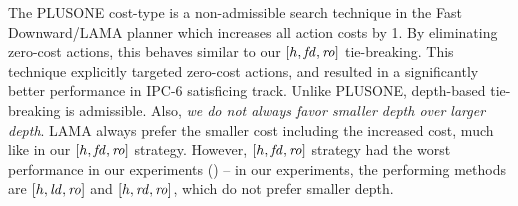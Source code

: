 The PLUSONE %
cost-type is a non-admissible search technique in the Fast Downward/LAMA planner
\cite{richter2010lama} which increases all action costs by 1.
By eliminating zero-cost actions, this behaves similar to our
$[h,\mbox{\textit{fd}},\mbox{\textit{ro}}]$ tie-breaking.
This technique explicitly targeted zero-cost actions,
and resulted in a significantly better performance in IPC-6
satisficing track.
Unlike PLUSONE, depth-based tie-breaking is admissible.
Also, \emph{we
do not always favor smaller depth over larger depth}. LAMA always prefer the
smaller cost including the increased cost, much like in our $[h,\mbox{\textit{fd}},\mbox{\textit{ro}}]$ strategy.
However, $[h,\mbox{\textit{fd}},\mbox{\textit{ro}}]$
strategy had the worst performance in our experiments () -- in our experiments, 
the performing methods are $[h,\mbox{\textit{ld}},\mbox{\textit{ro}}]$ and $[h,\mbox{\textit{rd}},\mbox{\textit{ro}}]$,
which do not prefer smaller depth.

